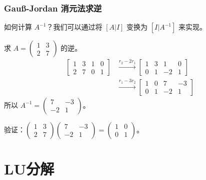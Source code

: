 \begin{frame}
\frametitle{Gauß-Jordan 消元法求逆}

如何计算 $A^{-1}$？我们可以通过将 $[A | I]$ 变换为 $[I | A^{-1}]$ 来实现。

\begin{eg}
求 $A = \begin{pmatrix} 1 & 3 \\ 2 & 7 \end{pmatrix}$ 的逆。
\begin{align*}
\left[ \begin{array}{cc|cc} 1 & 3 & 1 & 0 \\ 2 & 7 & 0 & 1 \end{array} \right]
&\xrightarrow{r_2 - 2r_1}
\left[ \begin{array}{cc|cc} 1 & 3 & 1 & 0 \\ 0 & 1 & -2 & 1 \end{array} \right] \\
&\xrightarrow{r_1 - 3r_2}
\left[ \begin{array}{cc|cc} 1 & 0 & 7 & -3 \\ 0 & 1 & -2 & 1 \end{array} \right]
\end{align*}
所以 $A^{-1} = \begin{pmatrix} 7 & -3 \\ -2 & 1 \end{pmatrix}$。
\end{eg}

验证：$\begin{pmatrix} 1 & 3 \\ 2 & 7 \end{pmatrix} \begin{pmatrix} 7 & -3 \\ -2 & 1 \end{pmatrix} = \begin{pmatrix} 1 & 0 \\ 0 & 1 \end{pmatrix}$。

\end{frame}


\section{LU分解}


